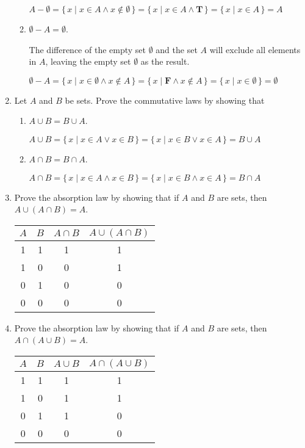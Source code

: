 \documentclass[11pt]{article}
\begin{document}
\begin{enumerate}[label=\textbf{\arabic*.}]
\begin{enumerate}[label=\textbf{\alph*)}]
		$A - \emptyset = \{\,x \mid x \in A \land x \notin \emptyset\,\} = \{\,x \mid x \in A \land \textbf{T}\,\} = \{\,x \mid x \in A\,\}= A$
		
		\item $\emptyset - A = \emptyset$.
		
		The difference of the empty set $\emptyset$ and the set $A$ will exclude all elements in $A$, leaving the empty set $\emptyset$ as the result.
		
		$\emptyset - A = \{\,x \mid x \in \emptyset \land x \notin A\,\} = \{\,x \mid \textbf{F} \land x \notin A\,\} = \{\,x \mid x \in \emptyset\,\} = \emptyset$
	\end{enumerate}

	\item Let $A$ and $B$ be sets. Prove the commutative laws by showing that
	
	\begin{enumerate}[label=\textbf{\alph*)}]
		\item $A \cup B = B \cup A$.
		
		$A \cup B = \{\,x \mid x \in A \lor x \in B\,\} = \{\,x \mid x \in B \lor x \in A\,\} = B \cup A$
		
		\item $A \cap B = B \cap A$.
		
		$A \cap B = \{\,x \mid x \in A \land x \in B\,\} = \{\,x \mid x \in B \land x \in A\,\} = B \cap A$
	\end{enumerate}

	\item Prove the absorption law by showing that if $A$ and $B$ are sets, then $A \cup (A \cap B) = A$.
	
	\begin{tabular}{c | c | c | c}
		$A$ & $B$ & $A \cap B$ & $A \cup (A \cap B)$ \\
		\hline
		1 & 1 & 1 & 1 \\
		1 & 0 & 0 & 1 \\
		0 & 1 & 0 & 0 \\
		0 & 0 & 0 & 0 
	\end{tabular}

	\item Prove the absorption law by showing that if $A$ and $B$ are sets, then $A \cap (A \cup B) = A$.
	
	\begin{tabular}{c | c | c | c}
		$A$ & $B$ & $A \cup B$ & $A \cap (A \cup B)$ \\
		\hline
		1 & 1 & 1 & 1 \\
		1 & 0 & 1 & 1 \\
		0 & 1 & 1 & 0 \\
		0 & 0 & 0 & 0
	\end{tabular}


\end{enumerate}
\end{document}
